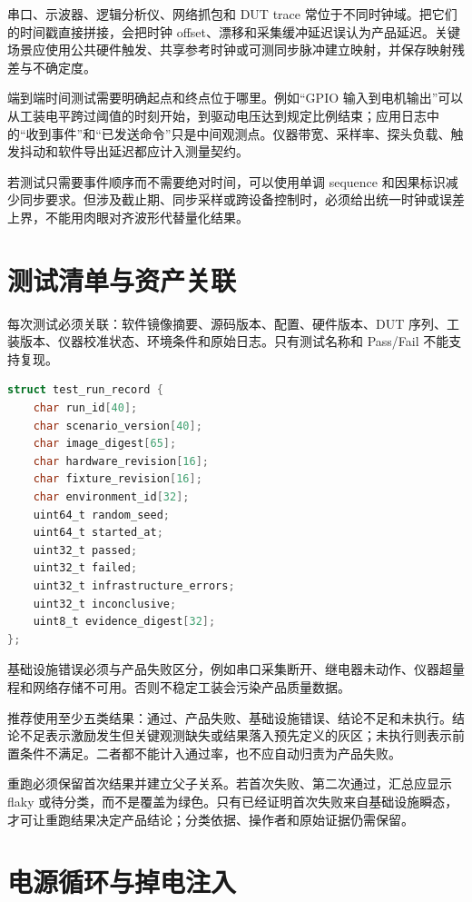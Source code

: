 串口、示波器、逻辑分析仪、网络抓包和 DUT trace 常位于不同时钟域。把它们的时间戳直接拼接，会把时钟 offset、漂移和采集缓冲延迟误认为产品延迟。关键场景应使用公共硬件触发、共享参考时钟或可测同步脉冲建立映射，并保存映射残差与不确定度。

端到端时间测试需要明确起点和终点位于哪里。例如“GPIO 输入到电机输出”可以从工装电平跨过阈值的时刻开始，到驱动电压达到规定比例结束；应用日志中的“收到事件”和“已发送命令”只是中间观测点。仪器带宽、采样率、探头负载、触发抖动和软件导出延迟都应计入测量契约。

若测试只需要事件顺序而不需要绝对时间，可以使用单调 sequence 和因果标识减少同步要求。但涉及截止期、同步采样或跨设备控制时，必须给出统一时钟或误差上界，不能用肉眼对齐波形代替量化结果。

\section{测试清单与资产关联}

每次测试必须关联：软件镜像摘要、源码版本、配置、硬件版本、DUT 序列、工装版本、仪器校准状态、环境条件和原始日志。只有测试名称和 Pass/Fail 不能支持复现。

\begin{lstlisting}[language=C,caption={测试结果 manifest 的逻辑字段}]
struct test_run_record {
    char run_id[40];
    char scenario_version[40];
    char image_digest[65];
    char hardware_revision[16];
    char fixture_revision[16];
    char environment_id[32];
    uint64_t random_seed;
    uint64_t started_at;
    uint32_t passed;
    uint32_t failed;
    uint32_t infrastructure_errors;
    uint32_t inconclusive;
    uint8_t evidence_digest[32];
};
\end{lstlisting}

基础设施错误必须与产品失败区分，例如串口采集断开、继电器未动作、仪器超量程和网络存储不可用。否则不稳定工装会污染产品质量数据。

推荐使用至少五类结果：通过、产品失败、基础设施错误、结论不足和未执行。结论不足表示激励发生但关键观测缺失或结果落入预先定义的灰区；未执行则表示前置条件不满足。二者都不能计入通过率，也不应自动归责为产品失败。

重跑必须保留首次结果并建立父子关系。若首次失败、第二次通过，汇总应显示 flaky 或待分类，而不是覆盖为绿色。只有已经证明首次失败来自基础设施瞬态，才可让重跑结果决定产品结论；分类依据、操作者和原始证据仍需保留。

\section{电源循环与掉电注入}

